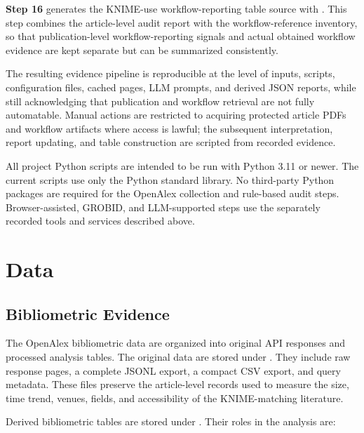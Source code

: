 \documentclass[runningheads]{llncs}
\begin{document}
\textbf{Step 16} generates the KNIME-use workflow-reporting table source with
. This step combines
the article-level audit report with the workflow-reference inventory, so that
publication-level workflow-reporting signals and actual obtained workflow
evidence are kept separate but can be summarized consistently.

The resulting evidence pipeline is reproducible at the level of inputs, scripts,
configuration files, cached pages, LLM prompts, and derived JSON reports, while
still acknowledging that publication and workflow retrieval are not fully
automatable. Manual actions are restricted to acquiring protected article PDFs
and workflow artifacts where access is lawful; the subsequent interpretation,
report updating, and table construction are scripted from recorded evidence.

All project Python scripts are intended to be run with Python 3.11 or newer.
The current scripts use only the Python standard library. No third-party
Python packages are required for the OpenAlex collection and rule-based audit
steps. Browser-assisted, GROBID, and LLM-supported steps use the separately
recorded tools and services described above.

\section{Data}

\subsection{Bibliometric Evidence}

The OpenAlex bibliometric data are organized into original API responses and
processed analysis tables. The original data are stored under
.
They include raw response pages, a complete JSONL export, a compact CSV export,
and query metadata. These files preserve the article-level records used to
measure the size, time trend, venues, fields, and accessibility of the
KNIME-matching literature.

Derived bibliometric tables are stored under
.
Their roles in the analysis are:
\end{document}
